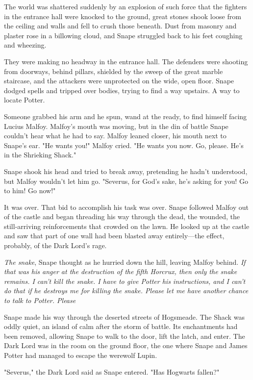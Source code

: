 The world was shattered suddenly by an explosion of such force that the fighters in the entrance hall were knocked to the ground, great stones shook loose from the ceiling and walls and fell to crush those beneath. Dust from masonry and plaster rose in a billowing cloud, and Snape struggled back to his feet coughing and wheezing.

They were making no headway in the entrance hall. The defenders were shooting from doorways, behind pillars, shielded by the sweep of the great marble staircase, and the attackers were unprotected on the wide, open floor. Snape dodged spells and tripped over bodies, trying to find a way upstairs. A way to locate Potter.

Someone grabbed his arm and he spun, wand at the ready, to find himself facing Lucius Malfoy. Malfoy's mouth was moving, but in the din of battle Snape couldn't hear what he had to say. Malfoy leaned closer, his mouth next to Snape's ear. "He wants you!" Malfoy cried. "He wants you now. Go, please. He's in the Shrieking Shack."

Snape shook his head and tried to break away, pretending he hadn't understood, but Malfoy wouldn't let him go. "Severus, for God's sake, he's asking for you! Go to him! Go now!"

It was over. That bid to accomplish his task was over. Snape followed Malfoy out of the castle and began threading his way through the dead, the wounded, the still-arriving reinforcements that crowded on the lawn. He looked up at the castle and saw that part of one wall had been blasted away entirely—the effect, probably, of the Dark Lord's rage.

\emph{The snake}, Snape thought as he hurried down the hill, leaving Malfoy behind. \emph{If that was his anger at the destruction of the fifth Horcrux, then only the snake remains. I can't kill the snake. I have to give Potter his instructions, and I can't do that if he destroys me for killing the snake. Please let me have another chance to talk to Potter. Please{\el}}

Snape made his way through the deserted streets of Hogsmeade. The Shack was oddly quiet, an island of calm after the storm of battle. Its enchantments had been removed, allowing Snape to walk to the door, lift the latch, and enter. The Dark Lord was in the room on the ground floor, the one where Snape and James Potter had managed to escape the werewolf Lupin.

"Severus," the Dark Lord said as Snape entered. "Has Hogwarts fallen?"


